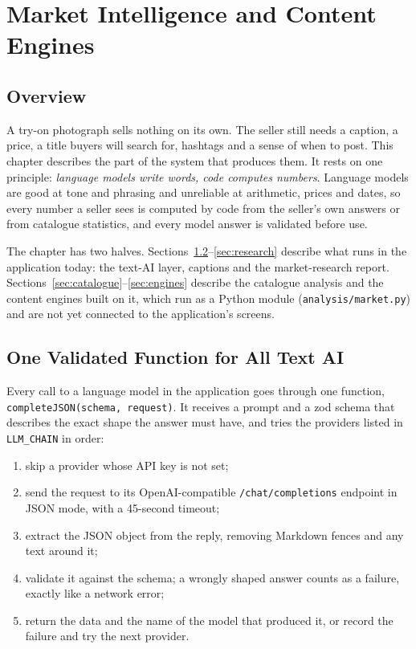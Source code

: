 \chapter{Market Intelligence and Content Engines}

\section{Overview}

A try-on photograph sells nothing on its own. The seller still needs a caption, a price, a title buyers will search for, hashtags and a sense of when to post. This chapter describes the part of the system that produces them. It rests on one principle: \emph{language models write words, code computes numbers}. Language models are good at tone and phrasing and unreliable at arithmetic, prices and dates, so every number a seller sees is computed by code from the seller's own answers or from catalogue statistics, and every model answer is validated before use.

The chapter has two halves. Sections~\ref{sec:llm}--\ref{sec:research} describe what runs in the application today: the text-AI layer, captions and the market-research report. Sections~\ref{sec:catalogue}--\ref{sec:engines} describe the catalogue analysis and the content engines built on it, which run as a Python module (\texttt{analysis/market.py}) and are not yet connected to the application's screens.

\section{One Validated Function for All Text AI}
\label{sec:llm}

Every call to a language model in the application goes through one function, \texttt{completeJSON(\allowbreak schema, request)}. It receives a prompt and a zod schema that describes the exact shape the answer must have, and tries the providers listed in \texttt{LLM\_CHAIN} in order:

\begin{enumerate}
\item skip a provider whose API key is not set;
\item send the request to its OpenAI-compatible \texttt{/chat/completions} endpoint in JSON mode, with a 45-second timeout;
\item extract the JSON object from the reply, removing Markdown fences and any text around it;
\item validate it against the schema; a wrongly shaped answer counts as a failure, exactly like a network error;
\item return the data and the name of the model that produced it, or record the failure and try the next provider.
\end{enumerate}

